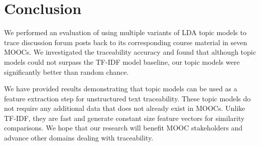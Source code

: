 \documentclass[sigconf, anonymous]{acmart}
\begin{document}
\section{Conclusion}
We performed an evaluation of using multiple variants of LDA topic models to trace discussion forum posts back to its corresponding course material in seven MOOCs.
We investigated the traceability accuracy and found that although topic models could not surpass the TF-IDF model baseline, our topic models were significantly better than random chance.

We have provided results demonstrating that topic models can be used as a feature extraction step for unstructured text traceability.
These topic models do not require any additional data that does not already exist in MOOCs.
Unlike TF-IDF, they are fast and generate constant size feature vectors for similarity comparisons.
We hope that our research will benefit MOOC stakeholders and advance other domains dealing with traceability.



\end{document}
